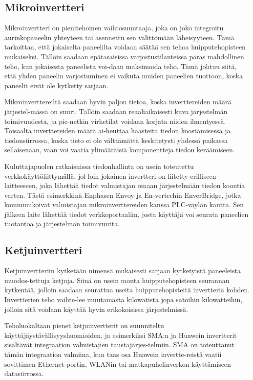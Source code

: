 \subsection{Mikroinvertteri}
  Mikroinvertteri on pienitehoinen vaihtosuuntaaja, joka on joko integroitu aurinkopaneelin yhteyteen tai asennettu sen välittömään läheisyyteen. Tämä tarkoittaa, että jokaiselta paneelilta voidaan säätää sen tehoa huipputehopisteen mukaiseksi. Tällöin saadaan epätasaisissa varjostustilanteissa paras mahdollinen teho, kun jokaisesta paneelista voi-daan maksimoida teho. Tämä johtuu siitä, että yhden paneelin varjostuminen ei vaikuta muiden paneelien tuottoon, koska paneelit eivät ole kytketty sarjaan. 

  Mikroinverttereiltä saadaan hyvin paljon tietoa, koska inverttereiden määrä järjestel-mässä on suuri. Tällöin saadaan reaaliaikaisesti kuva järjestelmän toimivuudesta, ja pie-netkin virhetilat voidaan korjata niiden ilmentyessä. Toisaalta inverttereiden määrä ai-heuttaa haasteita tiedon koostamisessa ja tiedonsiirrossa, koska tieto ei ole välttämättä keskitetysti yhdessä paikassa sellaisenaan, vaan voi vaatia ylimääräisiä komponentteja tiedon keräämiseen.

  Kuluttajapuolen ratkaisuissa tiedonhallinta on usein toteutettu verkkokäyttöliittymällä, jol-loin jokainen invertteri on liitetty erilliseen laitteeseen, joka lähettää tiedot valmistajan omaan järjestelmään tiedon koontia varten. Tästä esimerkkinä Enphasen Envoy ja En-vertechin EnverBridge, jotka kommunikoivat valmistajan mikroinverttereiden kanssa PLC-väylän kautta. Sen jälkeen laite lähettää tiedot verkkoportaaliin, josta käyttäjä voi seurata paneelien tuotantoa ja järjestelmän toimivuutta.

\subsection{Ketjuinvertteri}
  Ketjuinvertteriin kytketään nimensä mukaisesti sarjaan kytketyistä paneeleista muodos-tettuja ketjuja. Siinä on usein monta huipputehopisteen seurannan kytkentää, jolloin saadaan seurattua useita huipputehopisteitä invertteriä kohden. Invertterien teho vaihte-lee muutamasta kilowatista jopa satoihin kilowatteihin, jolloin sitä voidaan käyttää hyvin erikokoisissa järjestelmissä. 

  Teholuokaltaan pienet ketjuinvertterit on suunniteltu käyttäjäystävällisyyshuomioiden, ja esimerkiksi SMA:n ja Huawein invertterit sisältävät integraation valmistajien taustajärjes-telmiin. SMA on toteuttanut tämän integraation valmiina, kun taas osa Huawein invertte-reistä vaatii sovittimen Ethernet-portin, WLANin tai matkapuhelinverkon käyttämiseen datasiirrossa.

